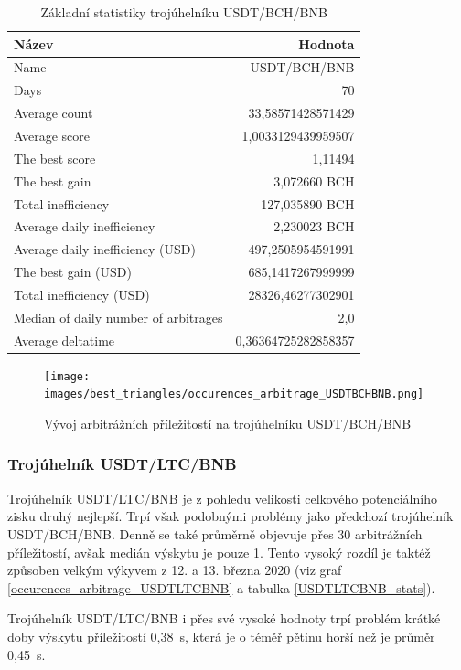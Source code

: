 \documentclass[thesis=B,czech]{FITthesis}[2019/03/21]
\begin{document}
\begin{table}\centering
\caption{Základní statistiky trojúhelníku USDT/BCH/BNB}
\label{USDTBCHBNB_stats}
\begin{tabular}{|| l | r ||}
\hline Název & Hodnota \\ 
\hline\hline Name & USDT/BCH/BNB \\ 
\hline Days & 70 \\ 
\hline Average count & 33,58571428571429 \\ 
\hline Average score & 1,0033129439959507 \\ 
\hline The best score & 1,11494 \\ 
\hline The best gain & 3,072660 BCH \\ 
\hline Total inefficiency & 127,035890 BCH \\ 
\hline Average daily inefficiency & 2,230023 BCH \\ 
\hline Average daily inefficiency (USD) & 497,2505954591991 \\ 
\hline The best gain (USD) & 685,1417267999999 \\ 
\hline Total inefficiency (USD) & 28326,46277302901 \\ 
\hline Median of daily number of arbitrages & 2,0 \\ 
\hline Average deltatime & 0,36364725282858357 \\ 
\hline
\end{tabular}
\end{table}

\begin{figure}\centering
	\texttt{[image: images/best\_triangles/occurences\_arbitrage\_USDTBCHBNB.png]}
	\caption{Vývoj arbitrážních příležitostí na trojúhelníku USDT/BCH/BNB }\label{occurences_arbitrage_USDTBCHBNB}
\end{figure}

\subsubsection{Trojúhelník USDT/LTC/BNB}
Trojúhelník USDT/LTC/BNB je z pohledu velikosti celkového potenciálního zisku druhý nejlepší. Trpí však podobnými problémy jako předchozí trojúhelník USDT/BCH/BNB. Denně se také průměrně objevuje přes 30 arbitrážních příležitostí, avšak medián výskytu je pouze 1. Tento vysoký rozdíl je taktéž způsoben velkým výkyvem z 12. a 13. března 2020 (viz graf \ref{occurences_arbitrage_USDTLTCBNB} a tabulka \ref{USDTLTCBNB_stats}).

Trojúhelník USDT/LTC/BNB i přes své vysoké hodnoty trpí problém krátké doby výskytu příležitostí 0,38~s, která je o téměř pětinu horší než je průměr 0,45~s.
\end{document}
